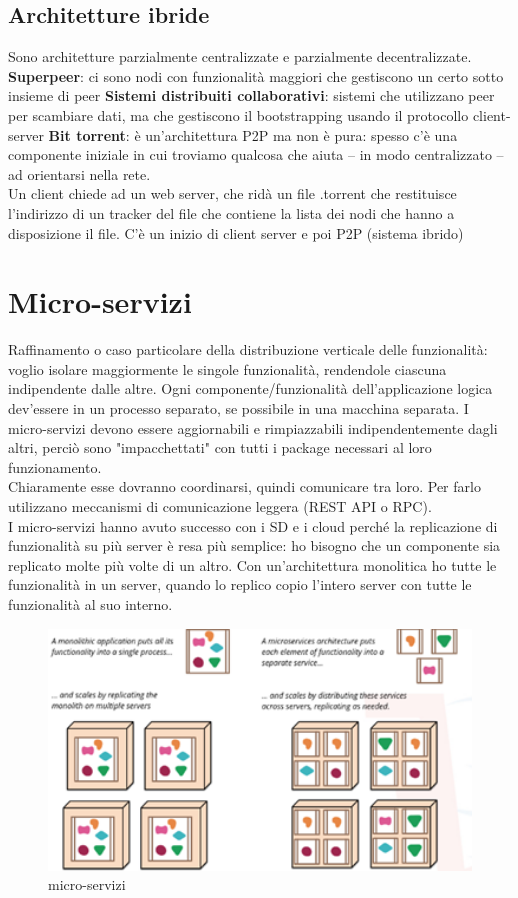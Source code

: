 \documentclass[12pt,italian]{report}
\begin{document}
\subsection{Architetture ibride}
Sono architetture parzialmente centralizzate e parzialmente decentralizzate. 
\bigbreak
\noindent \textbf{Superpeer}: ci sono nodi con funzionalità maggiori che gestiscono un certo sotto insieme di peer
\bigbreak
\noindent \textbf{Sistemi distribuiti collaborativi}: sistemi che utilizzano peer per scambiare dati, ma che gestiscono il bootstrapping usando il protocollo client-server
\bigbreak
\noindent \textbf{Bit torrent}: è un’architettura P2P ma non è pura: spesso c’è una componente iniziale in cui troviamo qualcosa che aiuta – in modo centralizzato – ad orientarsi nella rete. \\
Un client chiede ad un web server, che ridà un file .torrent che restituisce l’indirizzo di un tracker del file che contiene la lista dei nodi che hanno a disposizione il file.
C’è un inizio di client server e poi P2P (sistema ibrido)

\section{Micro-servizi}
Raffinamento o caso particolare della distribuzione verticale delle funzionalità: voglio isolare maggiormente le singole funzionalità, rendendole ciascuna indipendente dalle altre. Ogni componente/funzionalità dell'applicazione logica dev'essere in un processo separato, se possibile in una macchina separata. I micro-servizi devono essere aggiornabili e rimpiazzabili indipendentemente dagli altri, perciò sono "impacchettati" con tutti i package necessari al loro  funzionamento. \\  Chiaramente esse dovranno coordinarsi, quindi comunicare tra loro. Per farlo utilizzano meccanismi di comunicazione leggera (REST API o RPC). \\ I micro-servizi hanno avuto successo con i SD e i cloud perché la replicazione di funzionalità su più server è resa più semplice: ho bisogno che un componente sia replicato molte più volte di un altro. Con un'architettura monolitica ho tutte le funzionalità in un server, quando lo replico copio l'intero server con tutte le funzionalità al suo interno. 

\begin{figure}[h]
\centering
\includegraphics[width=130mm]{img/microser.png}
\caption{micro-servizi}
\label{fig:ms}
\end{figure}
\end{document}
